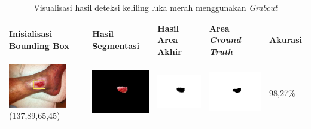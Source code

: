 \begin{table}[H]
	\centering
	\caption{Visualisasi hasil deteksi keliling luka merah menggunakan \emph{Grabcut}}
	\label{tabel_hasil_14}
	\begin{tabular}{|m{1.0in}|m{1.0in}|m{1.0in}|m{1.0in}|m{0.6in}|}
		\hline
		\textbf{Inisialisasi Bounding Box} & \textbf{Hasil Segmentasi} & \textbf{Hasil Area Akhir} & \textbf{Area \emph{Ground Truth}} & \textbf{Akurasi} \\
		\hline
		
		&  &  & \\
		\includegraphics[width=1.0in]{gambar/hasil_segmentasi/luka_merah/image_18_rect.jpg} {\centering\fontsize{10}{10}\selectfont(137,89,65,45)}&
		\includegraphics[width=1.0in]{gambar/hasil_segmentasi/luka_merah/result_18.jpg}&
		\includegraphics[width=1.0in]{gambar/hasil_segmentasi/luka_merah/mask_r_18.jpg}&
		\includegraphics[width=1.0in]{gambar/hasil_segmentasi/luka_merah/18_r.jpg}&
		98,27\% \\
		\hline


\end{tabular}
\end{table}
